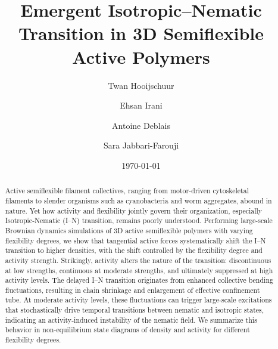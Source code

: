 \documentclass[
reprint,
superscriptaddress,
prl,









 amsmath,amssymb,
 aps,






]{revtex4-2}
\begin{document}
\title{Emergent Isotropic–Nematic Transition in 3D Semiflexible Active Polymers}

\author{Twan Hooijschuur}
\author{Ehsan Irani}
\author{Antoine Deblais}
\author{Sara Jabbari-Farouji}

\date{\today}

\begin{abstract}
Active semiflexible filament collectives, ranging from motor-driven cytoskeletal filaments to slender organisms such as cyanobacteria and worm aggregates, abound in nature. Yet how activity and flexibility jointly govern their organization, especially Isotropic-Nematic (I--N) transition, remains poorly understood. Performing large-scale Brownian dynamics simulations of 3D active semiflexible polymers with varying flexibility degrees, we show that tangential active forces systematically shift the I--N transition to higher densities, with the shift controlled by  the flexibility degree and activity strength. Strikingly, activity alters the nature of the transition: discontinuous at low strengths, continuous at moderate strengths, and ultimately suppressed at high activity levels.
The delayed I–N transition originates from enhanced collective bending fluctuations, resulting in chain shrinkage and enlargement of effective confinement tube. At moderate activity levels, these fluctuations can trigger large-scale excitations that stochastically drive temporal transitions between nematic and isotropic states, indicating an activity-induced instability of the nematic field. We summarize this behavior in non-equilibrium state diagrams of density and activity for different flexibility degrees.
\end{abstract}

\maketitle
\end{document}
